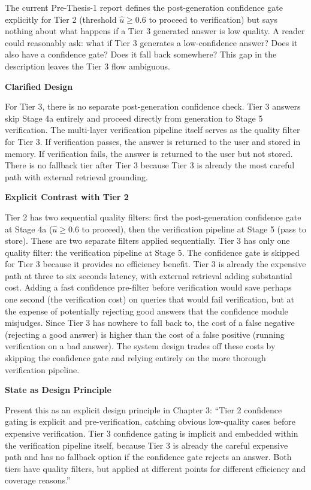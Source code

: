 \documentclass[11pt,a4paper]{article}
\newcommand{\architecturebox}[2]{%
\begin{tcolorbox}[enhanced,breakable,
  colback=LightTeal,colframe=Teal,boxrule=1.5pt,arc=4pt,
  left=8pt,right=8pt,top=6pt,bottom=6pt,
  title={\bfseries\small\color{white}#1},
  attach boxed title to top left={yshift=-2mm,xshift=6mm},
  boxed title style={colback=Teal,arc=3pt,boxrule=0pt,
    left=4pt,right=4pt,top=2pt,bottom=2pt}]
#2
\end{tcolorbox}}
\newcommand{\uhat}{\hat{u}}
\begin{document}
\architecturebox{ARCHITECTURE UPDATE 6: Tier 3 Uses Verification as Implicit Confidence Gate}{
The current Pre-Thesis-1 report defines the post-generation confidence gate explicitly for Tier 2 (threshold $\uhat \geq 0.6$ to proceed to verification) but says nothing about what happens if a Tier 3 generated answer is low quality. A reader could reasonably ask: what if Tier 3 generates a low-confidence answer? Does it also have a confidence gate? Does it fall back somewhere? This gap in the description leaves the Tier 3 flow ambiguous.

\textbf{Clarified Design}

For Tier 3, there is no separate post-generation confidence check. Tier 3 answers skip Stage 4a entirely and proceed directly from generation to Stage 5 verification. The multi-layer verification pipeline itself serves as the quality filter for Tier 3. If verification passes, the answer is returned to the user and stored in memory. If verification fails, the answer is returned to the user but not stored. There is no fallback tier after Tier 3 because Tier 3 is already the most careful path with external retrieval grounding.

\textbf{Explicit Contrast with Tier 2}

Tier 2 has two sequential quality filters: first the post-generation confidence gate at Stage 4a ($\uhat \geq 0.6$ to proceed), then the verification pipeline at Stage 5 (pass to store). These are two separate filters applied sequentially. Tier 3 has only one quality filter: the verification pipeline at Stage 5. The confidence gate is skipped for Tier 3 because it provides no efficiency benefit. Tier 3 is already the expensive path at three to six seconds latency, with external retrieval adding substantial cost. Adding a fast confidence pre-filter before verification would save perhaps one second (the verification cost) on queries that would fail verification, but at the expense of potentially rejecting good answers that the confidence module misjudges. Since Tier 3 has nowhere to fall back to, the cost of a false negative (rejecting a good answer) is higher than the cost of a false positive (running verification on a bad answer). The system design trades off these costs by skipping the confidence gate and relying entirely on the more thorough verification pipeline.

\textbf{State as Design Principle}

Present this as an explicit design principle in Chapter 3: ``Tier 2 confidence gating is explicit and pre-verification, catching obvious low-quality cases before expensive verification. Tier 3 confidence gating is implicit and embedded within the verification pipeline itself, because Tier 3 is already the careful expensive path and has no fallback option if the confidence gate rejects an answer. Both tiers have quality filters, but applied at different points for different efficiency and coverage reasons.''

}
\end{document}
